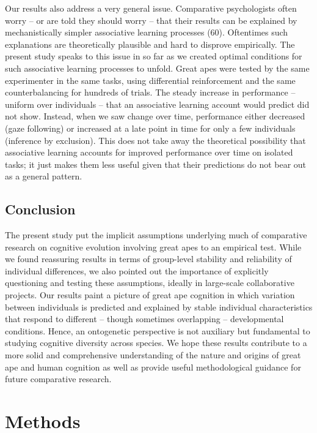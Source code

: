 \documentclass[
  man,floatsintext]{apa6}
\begin{document}
Our results also address a very general issue. Comparative psychologists often worry -- or are told they should worry -- that their results can be explained by mechanistically simpler associative learning processes (60). Oftentimes such explanations are theoretically plausible and hard to disprove empirically. The present study speaks to this issue in so far as we created optimal conditions for such associative learning processes to unfold. Great apes were tested by the same experimenter in the same tasks, using differential reinforcement and the same counterbalancing for hundreds of trials. The steady increase in performance -- uniform over individuals -- that an associative learning account would predict did not show. Instead, when we saw change over time, performance either decreased (gaze following) or increased at a late point in time for only a few individuals (inference by exclusion). This does not take away the theoretical possibility that associative learning accounts for improved performance over time on isolated tasks; it just makes them less useful given that their predictions do not bear out as a general pattern.

\hypertarget{conclusion}{%
\subsection{Conclusion}\label{conclusion}}

The present study put the implicit assumptions underlying much of comparative research on cognitive evolution involving great apes to an empirical test. While we found reassuring results in terms of group-level stability and reliability of individual differences, we also pointed out the importance of explicitly questioning and testing these assumptions, ideally in large-scale collaborative projects. Our results paint a picture of great ape cognition in which variation between individuals is predicted and explained by stable individual characteristics that respond to different -- though sometimes overlapping -- developmental conditions. Hence, an ontogenetic perspective is not auxiliary but fundamental to studying cognitive diversity across species. We hope these results contribute to a more solid and comprehensive understanding of the nature and origins of great ape and human cognition as well as provide useful methodological guidance for future comparative research.

\hypertarget{methods}{%
\section{Methods}\label{methods}}
\end{document}

